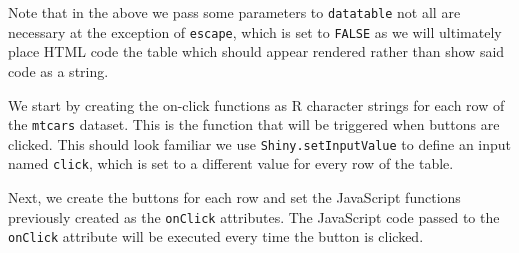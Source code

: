 \documentclass[10pt,]{krantz}
\makeatletter
\newenvironment{Shaded}{\begin{snugshade}}{\end{snugshade}}
\newcommand{\CommentTok}[1]{\textcolor[rgb]{0.37,0.37,0.37}{\textit{#1}}}
\newcommand{\ControlFlowTok}[1]{\textcolor[rgb]{0.27,0.27,0.27}{\textbf{#1}}}
\newcommand{\DataTypeTok}[1]{\textcolor[rgb]{0.27,0.27,0.27}{#1}}
\newcommand{\KeywordTok}[1]{\textcolor[rgb]{0.27,0.27,0.27}{\textbf{#1}}}
\newcommand{\NormalTok}[1]{#1}
\newcommand{\OperatorTok}[1]{\textcolor[rgb]{0.43,0.43,0.43}{\textbf{#1}}}
\newcommand{\OtherTok}[1]{\textcolor[rgb]{0.37,0.37,0.37}{#1}}
\newcommand{\StringTok}[1]{\textcolor[rgb]{0.5,0.5,0.5}{#1}}
\newenvironment{kframe}{%
\medskip{}
\setlength{\fboxsep}{.8em}
 \def\at@end@of@kframe{}%
 \ifinner\ifhmode%
  \def\at@end@of@kframe{\end{minipage}}%
  \begin{minipage}{\columnwidth}%
 \fi\fi%
 \def\FrameCommand##1{\hskip\@totalleftmargin \hskip-\fboxsep
 \colorbox{shadecolor}{##1}\hskip-\fboxsep
     \hskip-\linewidth \hskip-\@totalleftmargin \hskip\columnwidth}%
 \MakeFramed {\advance\hsize-\width
   \@totalleftmargin\z@ \linewidth\hsize
   \@setminipage}}%
 {\par\unskip\endMakeFramed%
 \at@end@of@kframe}
\renewenvironment{Shaded}{\begin{kframe}}{\end{kframe}}
\makeatother
\begin{document}
Note that in the above we pass some parameters to \texttt{datatable} not all are necessary at the exception of \texttt{escape}, which is set to \texttt{FALSE} as we will ultimately place HTML code the table which should appear rendered rather than show said code as a string.

We start by creating the on-click functions as R character strings for each row of the \texttt{mtcars} dataset. This is the function that will be triggered when buttons are clicked. This should look familiar we use \texttt{Shiny.setInputValue} to define an input named \texttt{click}, which is set to a different value for every row of the table.

\begin{Shaded}
\end{Shaded}

Next, we create the buttons for each row and set the JavaScript functions previously created as the \texttt{onClick} attributes. The JavaScript code passed to the \texttt{onClick} attribute will be executed every time the button is clicked.
\end{document}
